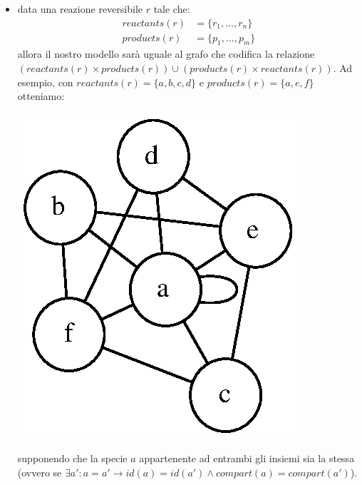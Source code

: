 \begin{itemize}
\item data una reazione reversibile $r$ tale che:
  \begin{displaymath}
    \begin{split} 
      reactants(r) &= \{ r_{1}, \ldots, r_{n} \} \\
      products(r) &= \{ p_{1}, \ldots, p_{m} \}
    \end{split}
  \end{displaymath}
  allora il nostro modello sar\`a uguale al grafo che codifica la
  relazione $(reactants(r) \times products(r)) \cup (products(r)
  \times reactants(r))$. Ad esempio, con $reactants(r) = \{ a, b, c, d
  \}$ e $products(r) = \{a, e, f\}$ otteniamo:

\begin{center}
\includegraphics{images/reversible-reaction-example.dot.eps}
\end{center}
supponendo che la specie $a$ appartenente ad entrambi gli
insiemi sia la stessa (ovvero se $\exists a': a = a' \rightarrow id(a) =
id(a') \wedge compart(a) = compart(a')$).

\end{itemize}
